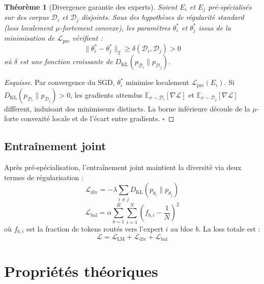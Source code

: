 \documentclass[10pt,a4paper]{article}
\newtheorem{theorem}{Théorème}
\begin{document}
\begin{theorem}[Divergence garantie des experts]
Soient $E_i$ et $E_j$ pré-spécialisés sur des corpus $\mathcal{D}_i$ et $\mathcal{D}_j$ disjoints. Sous des hypothèses de régularité standard (loss localement $\mu$-fortement convexe), les paramètres $\theta_i^*$ et $\theta_j^*$ issus de la minimisation de $\mathcal{L}_{\mathrm{pre}}$ vérifient :
\begin{equation}
  \|\theta_i^* - \theta_j^*\|_2 \geq \delta(\mathcal{D}_i, \mathcal{D}_j) > 0
\end{equation}
où $\delta$ est une fonction croissante de $D_{\mathrm{KL}}(p_{\mathcal{D}_i} \| p_{\mathcal{D}_j})$.
\end{theorem}

\begin{proof}[Esquisse]
Par convergence du SGD, $\theta_i^*$ minimise localement $\mathcal{L}_{\mathrm{pre}}(E_i)$. Si $D_{\mathrm{KL}}(p_{\mathcal{D}_i} \| p_{\mathcal{D}_j}) > 0$, les gradients attendus $\mathbb{E}_{x \sim \mathcal{D}_i}[\nabla \mathcal{L}]$ et $\mathbb{E}_{x \sim \mathcal{D}_j}[\nabla \mathcal{L}]$ diffèrent, induisant des minimiseurs distincts. La borne inférieure découle de la $\mu$-forte convexité locale et de l'écart entre gradients. $\square$
\end{proof}

\subsection{Entraînement joint}

Après pré-spécialisation, l'entraînement joint maintient la diversité via deux termes de régularisation :
\begin{equation}
  \mathcal{L}_{\mathrm{div}} = -\lambda \sum_{i \neq j} D_{\mathrm{KL}}\!\left(p_{\theta_i} \| p_{\theta_j}\right)
\end{equation}
\begin{equation}
  \mathcal{L}_{\mathrm{bal}} = \alpha \sum_{b=1}^{B} \sum_{i=1}^{N} \left(f_{b,i} - \frac{1}{N}\right)^2
\end{equation}
où $f_{b,i}$ est la fraction de tokens routés vers l'expert $i$ au bloc $b$. La loss totale est :
\begin{equation}
  \mathcal{L} = \mathcal{L}_{\mathrm{LM}} + \mathcal{L}_{\mathrm{div}} + \mathcal{L}_{\mathrm{bal}}
\end{equation}

\section{Propriétés théoriques}
\end{document}
